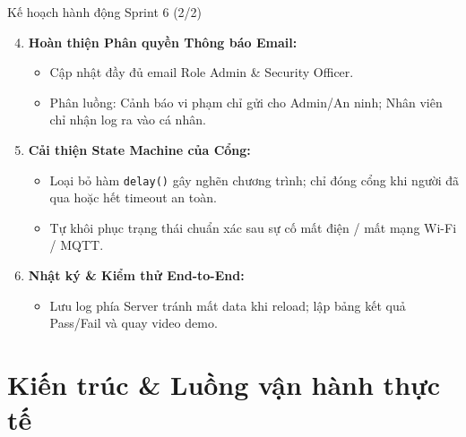 \documentclass[aspectratio=169]{beamer}
\begin{document}
\begin{frame}{Kế hoạch hành động Sprint 6 (2/2)}
  \begin{enumerate}
    \setcounter{enumi}{3}
    \item \textbf{Hoàn thiện Phân quyền Thông báo Email:}
      \begin{itemize}
        \item Cập nhật đầy đủ email Role Admin \& Security Officer.
        \item Phân luồng: Cảnh báo vi phạm chỉ gửi cho Admin/An ninh; Nhân viên chỉ nhận log ra vào cá nhân.
      \end{itemize}
    \vspace{0.3em}
    \item \textbf{Cải thiện State Machine của Cổng:}
      \begin{itemize}
        \item Loại bỏ hàm \texttt{delay()} gây nghẽn chương trình; chỉ đóng cổng khi người đã qua hoặc hết timeout an toàn.
        \item Tự khôi phục trạng thái chuẩn xác sau sự cố mất điện / mất mạng Wi-Fi / MQTT.
      \end{itemize}
    \vspace{0.3em}
    \item \textbf{Nhật ký \& Kiểm thử End-to-End:}
      \begin{itemize}
        \item Lưu log phía Server tránh mất data khi reload; lập bảng kết quả Pass/Fail và quay video demo.
      \end{itemize}
  \end{enumerate}
\end{frame}

\section{Kiến trúc \& Luồng vận hành thực tế}
\end{document}
